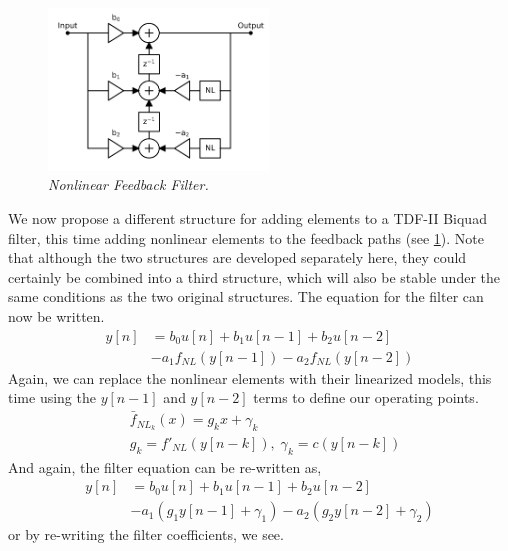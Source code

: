 \documentclass[twoside,a4paper]{article}
\begin{document}
%
\begin{figure}[ht]
    \center
    \includegraphics[width=2.3in]{../../NonlinearFeedback/Pics/NL2-TDF-II-White.png}
    \caption{\label{NL2-TDF-II}{\it Nonlinear Feedback Filter.}}
\end{figure}
%
We now propose a different structure for adding elements to a TDF-II
Biquad filter, this time adding nonlinear elements to the feedback
paths (see \cref{NL2-TDF-II}). Note that although the two structures are
developed separately here, they could certainly be combined into a third
structure, which will also be stable under the same conditions as the two
original structures. The equation for the filter can now be written.
%
\begin{equation}
    \begin{split}
        y[n] &= b_0 u[n] + b_1 u[n-1] + b_2 u[n-2] \\
             &- a_1 f_{NL}(y[n-1]) - a_2 f_{NL}(y[n-2])
    \end{split}
        \label{eq:nlbq2}
\end{equation}
%
Again, we can replace the nonlinear elements with their linearized
models, this time using the $y[n-1]$ and $y[n-2]$ terms to define our
operating points.
%
\begin{equation}
    \begin{split}
        & \bar{f}_{NL_k}(x) = g_k x + \gamma_k \\
        & g_k = f'_{NL}(y[n-k]), \; \gamma_k = c(y[n-k])
    \end{split}
        \label{eq:gs2}
\end{equation}
%
And again, the filter equation can be re-written as,
%
\begin{equation}
    \begin{split}
        y[n] & = b_0 u[n] + b_1 u[n-1] + b_2 u[n-2] \\
        & - a_1 (g_1 y[n-1] + \gamma_1)
        - a_2 (g_2 y[n-2] + \gamma_2)
    \end{split}
        \label{eq:nlbq2_rewrite}
\end{equation}
%
or by re-writing the filter coefficients, we see.
\end{document}
